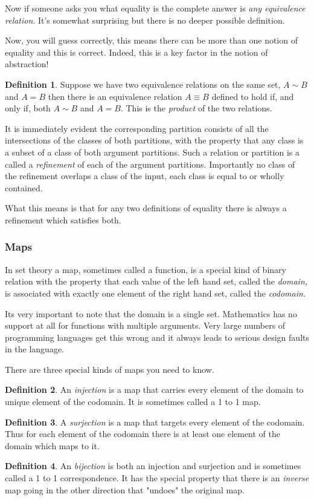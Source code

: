 \documentclass[oneside]{book}
\theoremstyle{plain}
\theoremstyle{definition}
\newtheorem{definition}{Definition}
\theoremstyle{plain}
\begin{document}
Now if someone asks you what equality is the complete
answer is {\em any equivalence relation}. It's somewhat
surprising but there is no deeper possible definition.

Now, you will guess correctly, this means there can
be more than one notion of equality and this is correct.
Indeed, this is a key factor in the notion of abstraction!

\begin{definition}
Suppose we have two equivalence relations on the same set,
$A\sim B$ and $A=B$ then there is an equivalence relation
$A\equiv B$ defined to hold if, and only if, both $A\sim B$ and
$A=B$. This is the {\em product} of the two relations. 
\end{definition}

It is immediately evident the corresponding partition
consists of all the intersections of the classes of both partitions,
with the property that any class is a subset of a class of both
argument partitions. Such a relation or partition is a called
a {\em refinement} of each of the argument partitions. Importantly
no class of the refinement overlaps a class of the input, each
class is equal to or wholly contained.

What this means is that for any two definitions of equality
there is always a refinement which satisfies both.

\subsubsection{Maps}
In set theory a map, sometimes called a function,
is a special kind of binary relation with the property
that each value of the left hand set, called the {\em domain,}
is associated with exactly one element of the right hand
set, called the {\em codomain.}

Its very important to note that the domain is a single set.
Mathematics has no support at all for functions with multiple
arguments. Very large numbers of programming languages get
this wrong and it always leads to serious design faults 
in the language.

There are three special kinds of maps you need to know.
\begin{definition}
An {\em injection} is a map that carries every element
of the domain to unique element of the codomain. It is
sometimes called a 1 to 1 map.
\end{definition}
\begin{definition}
A {\em surjection} is a map that targets every element of
the codomain. Thus for each element of the codomain
there is at least one element of the domain which maps to it.
\end{definition}
\begin{definition}
An {\em bijection} is both an injection and surjection and
is sometimes called a 1 to 1 correspondence. It has the special
property that there is an {\em inverse} map going in the other direction
that "undoes" the original map.
\end{definition}
\end{document}
